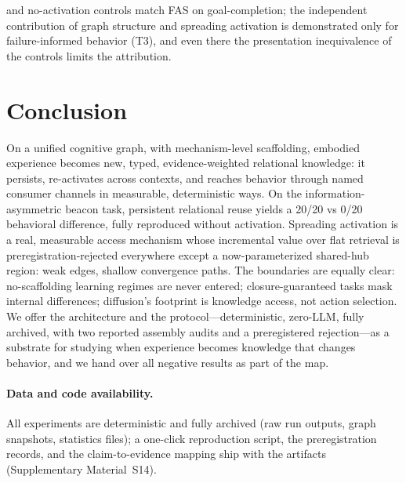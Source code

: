 \documentclass[10pt,a4paper]{article}
\begin{document}
and no-activation controls match FAS on goal-completion; the independent contribution of graph structure and spreading activation is demonstrated only for failure-informed behavior (T3), and even there the presentation inequivalence of the controls limits the attribution.

\section{Conclusion}
On a unified cognitive graph, with mechanism-level scaffolding, embodied experience becomes new, typed, evidence-weighted relational knowledge: it persists, re-activates across contexts, and reaches behavior through named consumer channels in measurable, deterministic ways. On the information-asymmetric beacon task, persistent relational reuse yields a 20/20 vs 0/20 behavioral difference, fully reproduced without activation. Spreading activation is a real, measurable access mechanism whose incremental value over flat retrieval is preregistration-rejected everywhere except a now-parameterized shared-hub region: weak edges, shallow convergence paths. The boundaries are equally clear: no-scaffolding learning regimes are never entered; closure-guaranteed tasks mask internal differences; diffusion's footprint is knowledge access, not action selection. We offer the architecture and the protocol---deterministic, zero-LLM, fully archived, with two reported assembly audits and a preregistered rejection---as a substrate for studying when experience becomes knowledge that changes behavior, and we hand over all negative results as part of the map.

\paragraph{Data and code availability.} All experiments are deterministic and fully archived (raw run outputs, graph snapshots, statistics files); a one-click reproduction script, the preregistration records, and the claim-to-evidence mapping ship with the artifacts (Supplementary Material~S14).



\end{document}
